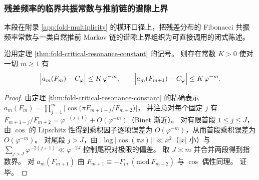 
\subsubsection{残差频率的临界共振常数与推前链的谱隙上界}\label{subsubsec:fold-residual-fourier-constant-and-gap}
本段在附录 \ref{app:fold-multiplicity} 的模环口径上，把残差分布的 Fibonacci 共振频率常数与一类自然推前 Markov 链的谱隙上界组织为可直接调用的闭式陈述。

\begin{proposition}[临界共振幅度的指数收敛率]\label{prop:fold-critical-resonance-constant-exp-rate}
沿用定理 \ref{thm:fold-critical-resonance-constant} 的记号。
则存在常数 \(K>0\) 使对一切 \(m\ge 1\) 有
\[
\Bigl|a_m(F_m)-C_\varphi\Bigr|\le K\,\varphi^{-m},
\qquad
\Bigl|a_m(F_{m+1})-C_\varphi\Bigr|\le K\,\varphi^{-m}.
\]
\end{proposition}

\begin{proof}
由定理 \ref{thm:fold-critical-resonance-constant} 的精确表示
\(
a_m(F_m)=\prod_{j=1}^m\bigl|\cos\bigl(\pi F_{m+1-j}/F_{m+2}\bigr)\bigr|
\)，
并注意对每个固定 \(j\) 有
\(
F_{m+1-j}/F_{m+2}=\varphi^{-(j+1)}+O(\varphi^{-m})
\)（Binet 渐近）。
对有限首段 \(1\le j\le J\)，由 \(\cos\) 的 Lipschitz 性得到乘积因子逐项误差为 \(O(\varphi^{-m})\)，从而首段乘积误差为 \(O(\varphi^{-m})\)。
对尾段 \(j>J\)，由 \(|\log|\cos(\pi x)||\ll x^2\)（\(|x|\) 小）与 \(\sum_{j>J}\varphi^{-2(j+1)}\ll \varphi^{-2J}\) 控制尾积对极限的偏差。
取 \(J\asymp m\) 并合并两段得到指数界。
对 \(a_m(F_{m+1})\) 由 \(F_{m+1}\equiv -F_m\ (\mathrm{mod}\ F_{m+2})\) 与 \(\cos\) 偶性同理。
证毕。
\end{proof}

